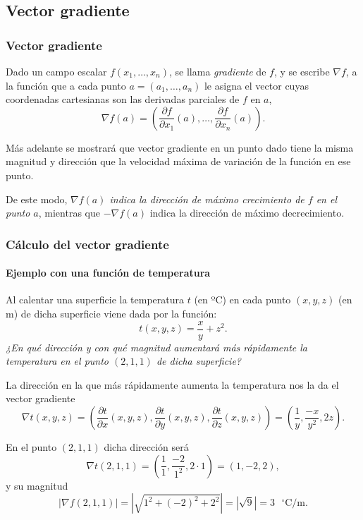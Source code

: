 \subsection{Vector gradiente}
\begin{frame}
	\frametitle{Vector gradiente}
	\begin{definicion}
		Dado un campo escalar $f(x_1,\ldots,x_n)$, se llama \emph{gradiente} de $f$, y se escribe $\nabla f$, a la función que a
		cada punto $a=(a_1,\ldots,a_n)$ le asigna el vector cuyas coordenadas cartesianas son las derivadas parciales de $f$ en
		$a$,
		\[
			\nabla f(a)=\left(\frac{\partial f}{\partial x_1}(a),\ldots,\frac{\partial f}{\partial x_n}(a)\right).
		\]
	\end{definicion}
	
	Más adelante se mostrará que vector gradiente en un punto dado tiene la misma magnitud y dirección que la velocidad máxima de variación de la
	función en ese punto. 
	
	De este modo, \alert{\emph{$\nabla f(a)$ indica la dirección de máximo crecimiento de $f$ en el punto $a$}}, mientras que $- \nabla f(a)$ indica la dirección de máximo decrecimiento.
\end{frame}



\begin{frame}
	\frametitle{Cálculo del vector gradiente}
	\framesubtitle{Ejemplo con una función de temperatura}
	Al calentar una superficie la temperatura $t$ (en ºC) en cada punto $(x,y,z)$ (en m) de dicha superficie viene dada por
	la función:
	\[ 
		t(x,y,z)=\frac{x}{y}+z^2. 
	\]
	\emph{¿En qué dirección y con qué magnitud aumentará más rápidamente la temperatura en el punto $(2,1,1)$ de dicha superficie?}
	
	
	La dirección en la que más rápidamente aumenta la temperatura nos la da el vector gradiente 
	\[
		\nabla t(x,y,z)=\left(\frac{\partial t}{\partial x}(x,y,z),\frac{\partial t}{\partial y}(x,y,z),\frac{\partial t}{\partial
			z}(x,y,z)\right)=\left(\frac{1}{y},\frac{-x}{y^2},2z\right).
	\]
	
	En el punto $(2,1,1)$ dicha dirección será
	\[
		\nabla t(2,1,1)=\left(\frac{1}{1},\frac{-2}{1^2},2\cdot 1\right)=(1,-2,2),
	\]
	y su magnitud 
	\[
		|\nabla f(2,1,1)|=|\sqrt{1^2+(-2)^2+2^2}|=|\sqrt{9}|=3 \mbox{ $^\circ$C/m}.
	\]
\end{frame}



